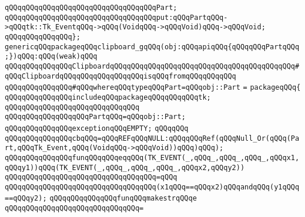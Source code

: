 \newline
\verb|qQQqqQQqqQQqqQQqqQQqqQQqqQQqqQQqqQQqPart;|\newline
\verb|qQQqqQQqqQQqqQQqqQQqqQQqqQQqqQQqqQQqput:qQQqPartqQQq->qQQqtk::Tk_EventqQQq->qQQq(VoidqQQq->qQQqVoid)qQQq->qQQqVoid;|\newline
\verb|qQQqqQQqqQQqqQQq};|\newline
\newline
\newline
\verb|genericqQQqpackageqQQqclipboard_gqQQq(obj:qQQqapiqQQq{qQQqqQQqPartqQQq;})qQQq:qQQq(weak)qQQq|\newline
\verb|qQQqqQQqqQQqqQQqClipboardqQQqqQQqqQQqqQQqqQQqqQQqqQQqqQQqqQQqqQQqqQQq#qQQqClipboardqQQqqQQqqQQqqQQqqQQqisqQQqfromqQQqqQQqqQQq|\newline
\verb|qQQqqQQqqQQqqQQq#qQQqwhereqQQqtypeqQQqPart=qQQqobj::Part|\newline
\verb|=|\newline
\verb|packageqQQq{|\newline
\newline
\verb|qQQqqQQqqQQqqQQqincludeqQQqpackageqQQqqQQqqQQqtk;|\newline
\verb|qQQqqQQqqQQqqQQqqQQqqQQqqQQqqQQq|\newline
\verb|qQQqqQQqqQQqqQQqqQQqPartqQQq=qQQqobj::Part;|\newline
\newline
\verb|qQQqqQQqqQQqqQQqexceptionqQQqEMPTY;|\newline
\verb|qQQqqQQq|\newline
\verb|qQQqqQQqqQQqqQQqcbqQQq=qQQqREFqQQqNULL:qQQqqQQqRef(qQQqNull_Or(qQQq(Part,qQQqTk_Event,qQQq(VoidqQQq->qQQqVoid))qQQq)qQQq);|\newline
\newline
\newline
\verb|qQQqqQQqqQQqqQQqfunqQQqqQQqeqqQQq(TK_EVENT(_,qQQq_,qQQq_,qQQq_,qQQqx1,qQQqy1))qQQq(TK_EVENT(_,qQQq_,qQQq_,qQQq_,qQQqx2,qQQqy2))|\newline
\verb|qQQqqQQqqQQqqQQqqQQqqQQqqQQqqQQqqQQq=qQQq|\newline
\verb|qQQqqQQqqQQqqQQqqQQqqQQqqQQqqQQqqQQq(x1qQQq==qQQqx2)qQQqandqQQq(y1qQQq==qQQqy2);|\newline
\newline
\verb|qQQqqQQqqQQqqQQqfunqQQqmakestrqQQqe|\newline
\verb|qQQqqQQqqQQqqQQqqQQqqQQqqQQqqQQq=|\newline
